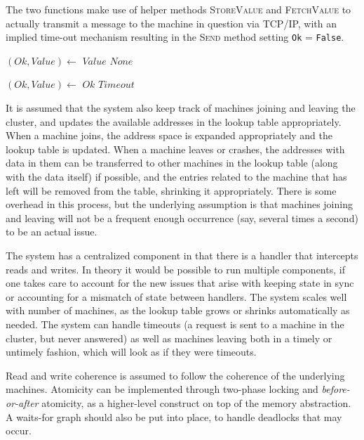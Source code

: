 The two functions make use of helper methods \textsc{StoreValue} and
\textsc{FetchValue} to actually transmit a message to the
machine in question via TCP/IP, with an implied time-out mechanism resulting in
the \textsc{Send} method setting \texttt{Ok} = \texttt{False}.

\begin{algorithmic}
    \State $(Ok, Value) \gets$ 
        \State \Return $Value$
    \Else
        \State \Return $None$
    \EndIf
\EndFunction

\Statex

    \State $(Ok, Value) \gets$ 
        \State \Return $Ok$
    \Else
        \State \Return $Timeout$
    \EndIf
\EndFunction
\end{algorithmic}

It is assumed that the system also keep track of machines joining and leaving
the cluster, and updates the available addresses in the lookup table
appropriately. When a machine joins, the address space is expanded
appropriately and the lookup table is updated. When a machine leaves or crashes,
the addresses with data in them can be transferred to other machines in the
lookup table (along with the data itself) if possible, and the entries related
to the machine that has left will be removed from the table, shrinking it
appropriately. There is some overhead in this process, but the underlying
assumption is that machines joining and leaving will not be a frequent enough
occurrence (say, several times a second) to be an actual issue.

The system has a centralized component in that there is a handler that
intercepts reads and writes. In theory it would be possible to run multiple
components, if one takes care to account for the new issues that arise with
keeping state in sync or accounting for a mismatch of state between handlers.
The system scales well with number of machines, as the lookup table grows or
shrinks automatically as needed. The system can handle timeouts (a request is
sent to a machine in the cluster, but never answered) as well as machines
leaving both in a timely or untimely fashion, which will look as if they were
timeouts.

Read and write coherence is assumed to follow the coherence of the underlying
machines. Atomicity can be implemented through two-phase locking and
\textit{before-or-after} atomicity, as a higher-level construct on top of the 
memory abstraction. A waits-for graph should also be put into place, to handle 
deadlocks that may occur.


